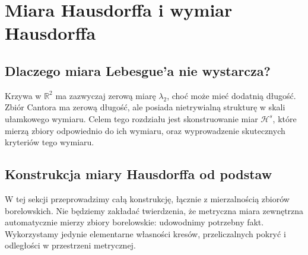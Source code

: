 \documentclass[11pt,a4paper,oneside]{book}
\numberwithin{equation}{chapter}
\theoremstyle{plain}
\theoremstyle{definition}
\theoremstyle{remark}
\begin{document}
\chapter{Miara Hausdorffa i wymiar Hausdorffa}
\label{ch:hausdorff-26}

\section{Dlaczego miara Lebesgue'a nie wystarcza?}
Krzywa w $\mathbb R^2$ ma zazwyczaj zerową miarę
$\lambda_2$, choć może mieć dodatnią długość.
Zbiór Cantora ma zerową długość, ale posiada nietrywialną
strukturę w skali ułamkowego wymiaru. Celem tego
rozdziału jest skonstruowanie miar $\mathcal H^s$,
które mierzą zbiory odpowiednio do ich wymiaru, oraz
wyprowadzenie skutecznych kryteriów tego wymiaru.

\section{Konstrukcja miary Hausdorffa od podstaw}
\label{sec:hausdorff-konstrukcja-26}

W tej sekcji przeprowadzimy całą konstrukcję, łącznie z
mierzalnością zbiorów borelowskich. Nie będziemy zakładać
twierdzenia, że metryczna miara zewnętrzna automatycznie
mierzy zbiory borelowskie: udowodnimy potrzebny fakt.
Wykorzystamy jedynie elementarne własności kresów,
przeliczalnych pokryć i odległości w przestrzeni metrycznej.
\end{document}

